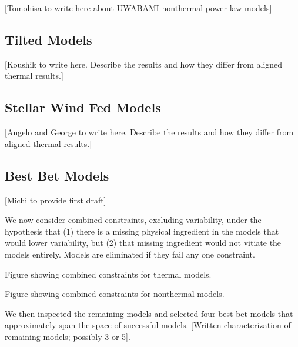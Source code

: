 [Tomohisa to write here about UWABAMI nonthermal power-law models]


\subsection{Tilted Models}

[Koushik to write here.  Describe the results and how they differ from aligned thermal results.]


\subsection{Stellar Wind Fed Models}

[Angelo and George to write here.  Describe the results and how they differ from aligned thermal results.]


\subsection{Best Bet Models}

\begin{figure*}
    \caption{Best bet models.  Each column corresponds to one best bet model; top row shows a 230GHz image [average or selected image; or use GIF?]; middle row shows an 86GHz images; bottom row shows SEDs.}
    \label{fig:my_label}
\end{figure*}

[Michi to provide first draft]

We now consider combined constraints, excluding variability, under the hypothesis that (1) there is a missing physical ingredient in the models that would lower variability, but (2) that missing ingredient would not vitiate the models entirely.  Models are eliminated if they fail any one constraint.

Figure showing combined constraints for thermal models.

Figure showing combined constraints for nonthermal models.

We then inspected the remaining models and selected four best-bet models that approximately span the space of successful models.  [Written characterization of remaining models; possibly 3 or 5].
